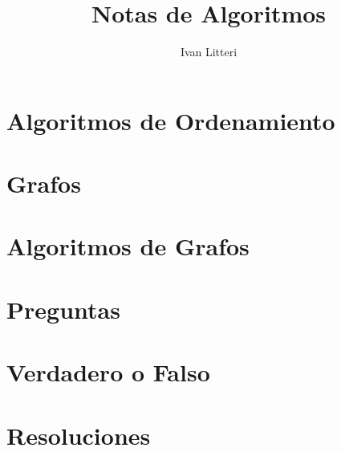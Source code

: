 \documentclass{article}
\title{Notas de Algoritmos}
\author{Ivan Litteri}
\date{}
\begin{document}
\maketitle
\lstset{language=C}
\lstset{language=Python}
\tableofcontents
\clearpage

\section{Algoritmos de Ordenamiento}


\clearpage

\section{Grafos}

\clearpage

\section{Algoritmos de Grafos}

\clearpage

\section{Preguntas}

\clearpage

\section{Verdadero o Falso}

\clearpage

\section{Resoluciones}

\clearpage

\printindex
\end{document}
